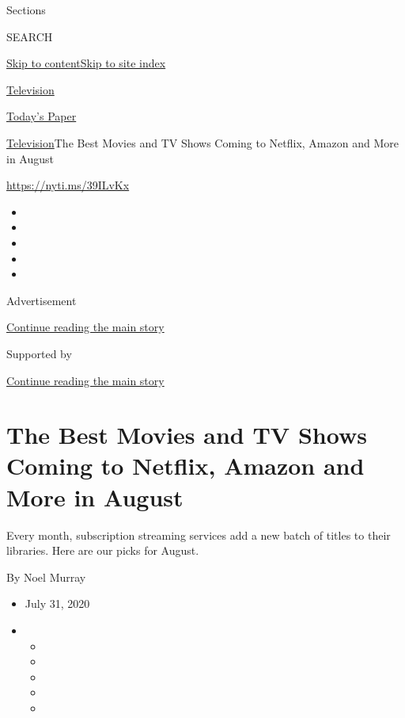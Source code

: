 Sections

SEARCH

\protect\hyperlink{site-content}{Skip to
content}\protect\hyperlink{site-index}{Skip to site index}

\href{https://www.nytimes.com/section/arts/television}{Television}

\href{https://myaccount.nytimes.com/auth/login?response_type=cookie\&client_id=vi}{}

\href{https://www.nytimes.com/section/todayspaper}{Today's Paper}

\href{/section/arts/television}{Television}\textbar{}The Best Movies and
TV Shows Coming to Netflix, Amazon and More in August

\url{https://nyti.ms/39ILvKx}

\begin{itemize}
\item
\item
\item
\item
\item
\end{itemize}

Advertisement

\protect\hyperlink{after-top}{Continue reading the main story}

Supported by

\protect\hyperlink{after-sponsor}{Continue reading the main story}

\hypertarget{the-best-movies-and-tv-shows-coming-to-netflix-amazon-and-more-in-august}{%
\section{The Best Movies and TV Shows Coming to Netflix, Amazon and More
in
August}\label{the-best-movies-and-tv-shows-coming-to-netflix-amazon-and-more-in-august}}

Every month, subscription streaming services add a new batch of titles
to their libraries. Here are our picks for August.

By Noel Murray

\begin{itemize}
\item
  July 31, 2020
\item
  \begin{itemize}
  \item
  \item
  \item
  \item
  \item
  \end{itemize}
\end{itemize}

